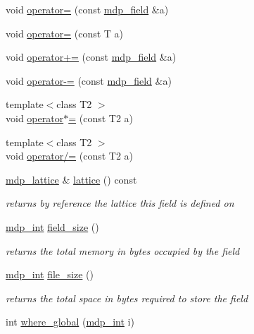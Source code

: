 \begin{DoxyCompactItemize}
\item 
void \hyperlink{classmdp__field_a3fd348984e7f37a5d85e18bb12212017}{operator=} (const \hyperlink{classmdp__field}{mdp\+\_\+field} \&a)
\item 
void \hyperlink{classmdp__field_a24364bce6444668661a0688632af87ec}{operator=} (const T a)
\item 
void \hyperlink{classmdp__field_a274d9e292a6adc1703a5ad585c99036e}{operator+=} (const \hyperlink{classmdp__field}{mdp\+\_\+field} \&a)
\item 
void \hyperlink{classmdp__field_a84b91b09eff5b553ea69bbcb0da9fbd4}{operator-\/=} (const \hyperlink{classmdp__field}{mdp\+\_\+field} \&a)
\item 
{\footnotesize template$<$class T2 $>$ }\\void \hyperlink{classmdp__field_a4e844650a6b7a849207500c13c19e14a}{operator$\ast$=} (const T2 a)
\item 
{\footnotesize template$<$class T2 $>$ }\\void \hyperlink{classmdp__field_a0ffc4ca9d566ea62c81f703d5e3ccfbf}{operator/=} (const T2 a)
\item 
\hyperlink{classmdp__lattice}{mdp\+\_\+lattice} \& \hyperlink{classmdp__field_a62ec98dec5fba14fd83549eb2693cf52}{lattice} () const
\begin{DoxyCompactList}\small\item\em returns by reference the lattice this field is defined on \end{DoxyCompactList}\item 
\hyperlink{mdp__global__vars_8h_aaa1ad9d0dcd2124aa5af0120d9954174}{mdp\+\_\+int} \hyperlink{classmdp__field_a6eff9dbb7dd88313ae2294c0178c4c74}{field\+\_\+size} ()
\begin{DoxyCompactList}\small\item\em returns the total memory in bytes occupied by the field \end{DoxyCompactList}\item 
\hyperlink{mdp__global__vars_8h_aaa1ad9d0dcd2124aa5af0120d9954174}{mdp\+\_\+int} \hyperlink{classmdp__field_ac6e5d57963f865e92cc59c3e9943fb3d}{file\+\_\+size} ()
\begin{DoxyCompactList}\small\item\em returns the total space in bytes required to store the field \end{DoxyCompactList}\item 
int \hyperlink{classmdp__field_ac8422b94f444285b0d34748ed6b7c06f}{where\+\_\+global} (\hyperlink{mdp__global__vars_8h_aaa1ad9d0dcd2124aa5af0120d9954174}{mdp\+\_\+int} i)

\end{DoxyCompactItemize}
